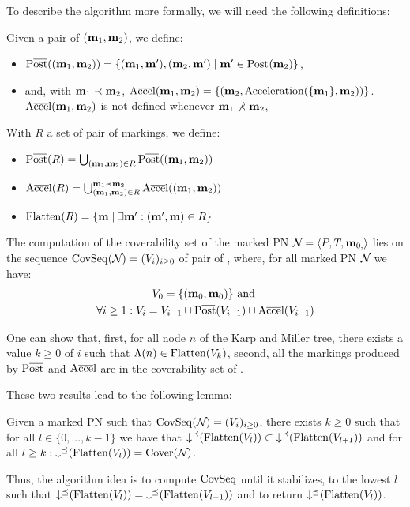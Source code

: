 To describe the algorithm more formally, we will need the following definitions:

Given a pair of \omarks $(\mathbf{m}_1, \mathbf{m}_2)$, we define:
\begin{itemize}
  \item $\Postb((\mar_1, \mar_2)) = \{(\mar_1, \mar'), (\mar_2, \mar') \mid \mar' \in \post{\mar_2}\}$,
  \item and, with $\mathbf{m}_1 \prec \mathbf{m}_2$, $\operatorname{A\overline{cce}l}(\mathbf{m}_1, \mathbf{m}_2) = \{(\mathbf{m}_2, \operatorname{Acceleration}(\{\mathbf{m}_1\}, \mathbf{m}_2))\}$.
    $\operatorname{A\overline{cce}l}(\mathbf{m}_1, \mathbf{m}_2)$ is not defined whenever $\mathbf{m}_1 \nprec \mathbf{m}_2$,
\end{itemize}

With $R$ a set of pair of markings, we define:
\begin{itemize}
  \item $\Postb(R) = \bigcup_{(\mar_1, \mar_2) \in R} \Postb((\mar_1, \mar_2))$
  \item $\operatorname{A\overline{cce}l}(R) = \bigcup_{(\mathbf{m}_1, \mathbf{m}_2) \in R}^{\mathbf{m}_1 \prec \mathbf{m}_2} \operatorname{A\overline{cce}l}((\mathbf{m}_1, \mathbf{m}_2))$
  \item $\operatorname{Flatten}(R) = \{\mathbf{m} \mid \exists \mathbf{m}' : (\mathbf{m}', \mathbf{m}) \in R\}$
\end{itemize}

The computation of the coverability set of the marked \ac{PN} $\mathcal{N}_{} = \left\langle P_{}, T_{}, \mathbf{m}_{0,}\right\rangle$ lies on the sequence $\operatorname{CovSeq}(\mathcal{N}_{}) = (V_i)_{i \geq 0}$ of pair of \omarks, where, for all marked \ac{PN} $\mathcal{N}_{}$ we have:
\begin{gather*}
  V_0 = \{(\mari, \mari)\} \text{ and } \\
  \forall i \geq 1 : V_i = V_{i-1} \cup \Postb(V_{i-1}) \cup \Accelb(V_{i-1})
\end{gather*}

One can show that,
first, for all node $n$ of the Karp and Miller tree, there exists a value $k \geq 0$ of $i$ such that $\operatorname{\Lambda}(n) \in \operatorname{Flatten}(V_k)$,
second, all the markings produced by $\Postb$ and $\operatorname{A\overline{cce}l}$ are in the coverability set of \namePN.

These two results lead to the following lemma:
\begin{lemm}
  Given a marked \ac{PN} \namePN such that $\operatorname{CovSeq}(\mathcal{N}_{}) = (V_i)_{i \geq 0}$,
  there exists $k \geq 0$ such that for all $l \in \{0, ..., k-1\}$ we have that $\operatorname{\downarrow^\preceq}(\operatorname{Flatten}(V_l)) \subset \operatorname{\downarrow^\preceq}(\operatorname{Flatten}(V_{l+1}))$
  and for all $l \geq k : \operatorname{\downarrow^\preceq}(\operatorname{Flatten}(V_l)) = \operatorname{Cover}(\mathcal{N}_{})$.
\end{lemm}

Thus, the algorithm idea is to compute $\operatorname{CovSeq}$ until it stabilizes,  to the lowest $l$ such that $\operatorname{\downarrow^\preceq}(\operatorname{Flatten}(V_l)) = \operatorname{\downarrow^\preceq}(\operatorname{Flatten}(V_{l-1}))$ and to return $\operatorname{\downarrow^\preceq}(\operatorname{Flatten}(V_l))$.

